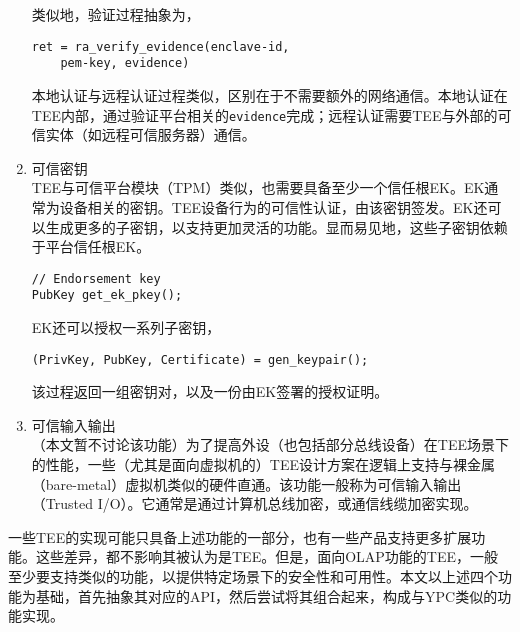 \begin{enumerate}
    类似地，验证过程抽象为，
    \begin{lstlisting}
ret = ra_verify_evidence(enclave-id, 
    pem-key, evidence)
    \end{lstlisting}
    
    本地认证与远程认证过程类似，区别在于不需要额外的网络通信。本地认证在TEE内部，通过验证平台相关的\texttt{evidence}完成；远程认证需要TEE与外部的可信实体（如远程可信服务器）通信。

    \item 可信密钥\\
    TEE与可信平台模块（TPM）类似，也需要具备至少一个信任根EK。EK通常为设备相关的密钥。TEE设备行为的可信性认证，由该密钥签发。EK还可以生成更多的子密钥，以支持更加灵活的功能。显而易见地，这些子密钥依赖于平台信任根EK。

    \begin{lstlisting}
// Endorsement key 
PubKey get_ek_pkey(); 
    \end{lstlisting} 

    EK还可以授权一系列子密钥，
    \begin{lstlisting}
(PrivKey, PubKey, Certificate) = gen_keypair(); 
    \end{lstlisting} 
    该过程返回一组密钥对，以及一份由EK签署的授权证明。

    \item 可信输入输出\\
    （本文暂不讨论该功能）为了提高外设（也包括部分总线设备）在TEE场景下的性能，一些（尤其是面向虚拟机的）TEE设计方案在逻辑上支持与裸金属（bare-metal）虚拟机类似的硬件直通。该功能一般称为可信输入输出（Trusted I/O）。它通常是通过计算机总线加密，或通信线缆加密实现。
\end{enumerate}

一些TEE的实现可能只具备上述功能的一部分，也有一些产品支持更多扩展功能。这些差异，都不影响其被认为是TEE。但是，面向OLAP功能的TEE，一般至少要支持类似的功能，以提供特定场景下的安全性和可用性。本文以上述四个功能为基础，首先抽象其对应的API，然后尝试将其组合起来，构成与YPC类似的功能实现。